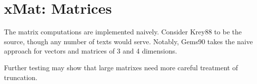 \section{xMat: Matrices}
The matrix computations are implemented naively.  Consider
Krey88 to be the source, though any number of texts would
serve.  Notably, Gems90 takes the naive approach for vectors
and matrices of 3 and 4 dimensions.

Further testing may show that large matrixes need more
careful treatment of truncation.
